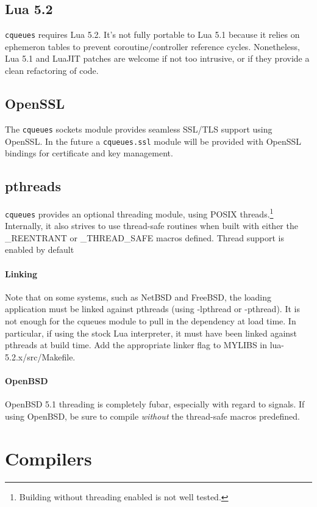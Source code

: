 \documentclass[11pt, oneside]{memoir}
\newcommand*{\cqueues}[0]{\texttt{cqueues}\xspace}
\newcommand*{\module}[1]{\texttt{#1}\xspace}
\begin{document}
\subsection{Lua 5.2}
\cqueues requires Lua 5.2. It's not fully portable to Lua 5.1 because it relies on ephemeron tables to prevent coroutine/controller reference cycles. Nonetheless, Lua 5.1 and LuaJIT patches are welcome if not too intrusive, or if they provide a clean refactoring of code.

\subsection{OpenSSL}
The \cqueues sockets module provides seamless SSL/TLS support using OpenSSL.
In the future a \module{cqueues.ssl} module will be provided with OpenSSL bindings for certificate and key management.

\subsection{pthreads}

\cqueues provides an optional threading module, using POSIX threads.\footnote{Building without threading enabled is not well tested.} Internally, it also strives to use thread-safe routines when built with either the \_REENTRANT or \_THREAD\_SAFE macros defined. Thread support is enabled by default 

\paragraph{Linking}
Note that on some systems, such as NetBSD and FreeBSD, the loading application must be linked against pthreads (using -lpthread or -pthread). It is not enough for the cqueues module to pull in the dependency at load time. In particular, if using the stock Lua interpreter, it must have been linked against pthreads at build time. Add the appropriate linker flag to MYLIBS in lua-5.2.x/src/Makefile.

\paragraph{OpenBSD}
OpenBSD 5.1 threading is completely fubar, especially with regard to signals. If using OpenBSD, be sure to compile \emph{without} the thread-safe macros predefined.

\section{Compilers}
\end{document}
